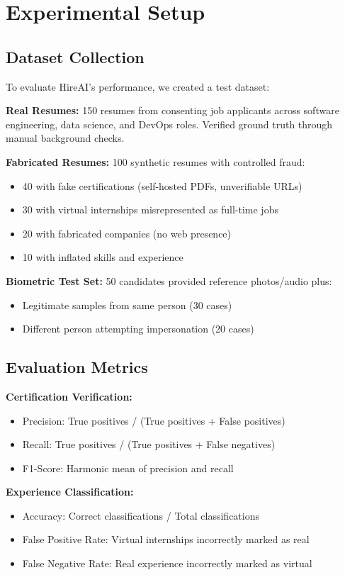 \documentclass[journal]{IEEEtran}
\begin{document}
\section{Experimental Setup}

\subsection{Dataset Collection}
To evaluate HireAI's performance, we created a test dataset:

\textbf{Real Resumes:} 150 resumes from consenting job applicants across software engineering, data science, and DevOps roles. Verified ground truth through manual background checks.

\textbf{Fabricated Resumes:} 100 synthetic resumes with controlled fraud:
\begin{itemize}
\item 40 with fake certifications (self-hosted PDFs, unverifiable URLs)
\item 30 with virtual internships misrepresented as full-time jobs
\item 20 with fabricated companies (no web presence)
\item 10 with inflated skills and experience
\end{itemize}

\textbf{Biometric Test Set:} 50 candidates provided reference photos/audio plus:
\begin{itemize}
\item Legitimate samples from same person (30 cases)
\item Different person attempting impersonation (20 cases)
\end{itemize}

\subsection{Evaluation Metrics}

\textbf{Certification Verification:}
\begin{itemize}
\item Precision: True positives / (True positives + False positives)
\item Recall: True positives / (True positives + False negatives)
\item F1-Score: Harmonic mean of precision and recall
\end{itemize}

\textbf{Experience Classification:}
\begin{itemize}
\item Accuracy: Correct classifications / Total classifications
\item False Positive Rate: Virtual internships incorrectly marked as real
\item False Negative Rate: Real experience incorrectly marked as virtual
\end{itemize}
\end{document}
